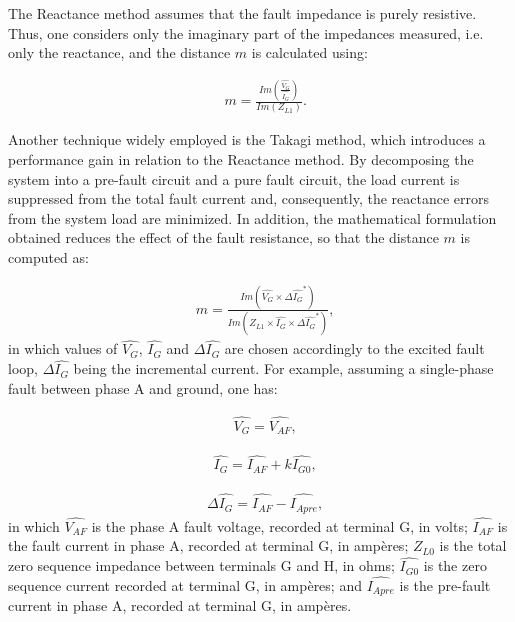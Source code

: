 \documentclass[conference]{IEEEtran}
\begin{document}
	The Reactance method assumes that the fault impedance is purely resistive. Thus, one considers only the imaginary part of the impedances measured, i.e. only the reactance, and the distance $m$ is calculated using:
	
	\begin{equation}\label{eq:mReac}
		\begin{aligned}
			&m=\frac{Im\left(\frac{\widehat{V_G}}{\widehat{I_G}}\right)}{Im(Z_{L1})}.
		\end{aligned}
	\end{equation}
	
	Another technique widely employed is the Takagi method, which introduces a performance gain in relation to the Reactance method. By decomposing the system into a pre-fault circuit and a pure fault circuit, the load current is suppressed from the total fault current and, consequently, the reactance errors from the system load are minimized. In addition, the mathematical formulation obtained reduces the effect of the fault resistance, so that the distance $m$ is computed as:
	
	\begin{equation}\label{eq:mTakagi}
		\begin{aligned}
			&m=\frac{Im(\widehat{V_G}\times\Delta\widehat{I_G}^*)}{Im(Z_{L1}\times\widehat{I_G}\times\Delta\widehat{I_G}^*)},
		\end{aligned}
	\end{equation}
	in which values of $\widehat{V_G}$, $\widehat{I_G}$ and $\Delta\widehat{I_G}$ are chosen accordingly to the excited fault loop, $\Delta\widehat{I_G}$ being the incremental current. For example, assuming a single-phase fault between phase A and ground, one has:
	
	\begin{equation}
		\begin{aligned}
			&\widehat{V_G}=\widehat{V_{AF}},
		\end{aligned}
	\end{equation}
	
	\begin{equation}
		\begin{aligned}
			&\widehat{I_G}=\widehat{I_{AF}}+k\widehat{I_{G0}},
		\end{aligned}
	\end{equation}	
	
	\begin{equation}
		\begin{aligned}
			&\Delta\widehat{I_G}=\widehat{I_{AF}}-\widehat{I_{Apre}},
		\end{aligned}
	\end{equation}
	in which $\widehat{V_{AF}}$ is the phase A fault voltage, recorded at terminal G, in volts; $\widehat{I_{AF}}$ is the fault current in phase A, recorded at terminal G, in ampères; $Z_{L0}$ is the total zero sequence impedance between terminals G and H, in ohms; $\widehat{I_{G0}}$ is the zero sequence current recorded at terminal G, in ampères; and $\widehat{I_{Apre}}$ is the pre-fault current in phase A, recorded at terminal G, in ampères.
	
\end{document}
